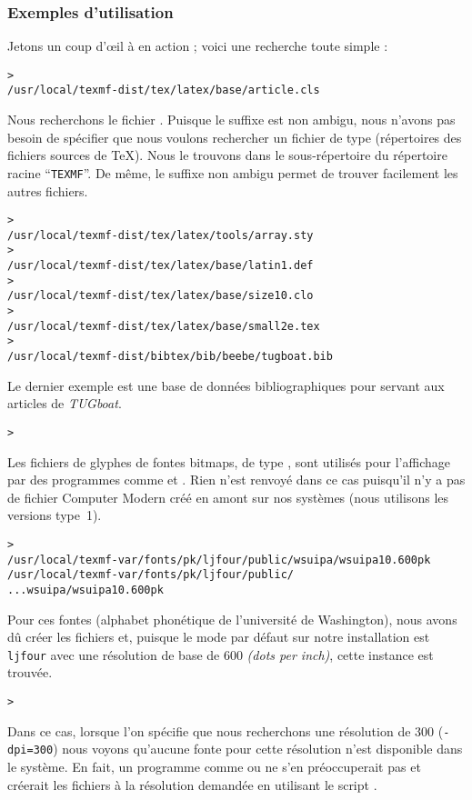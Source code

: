 \documentclass[german, english, french, 12pt]{article}
\renewcommand{\samp}[1]{\enquote{\texttt{#1}}}
\begin{document}
\subsubsection{Exemples d'utilisation}
\label{sec:examples-of-use}

Jetons un coup d'œil à \KPS{} en action ; voici une recherche toute simple :

\begin{alltt}
> 
/usr/local/texmf-dist/tex/latex/base/article.cls
\end{alltt}
Nous recherchons le fichier . Puisque le suffixe 
est non ambigu, nous n'avons pas besoin de spécifier que nous voulons rechercher
un fichier de type  (répertoires des fichiers sources de
\TeX{}). Nous le trouvons dans le sous-répertoire  du
répertoire racine \samp{TEXMF}.  De même, le suffixe non ambigu permet de
trouver facilement les autres fichiers.
\begin{alltt}
> 
   /usr/local/texmf-dist/tex/latex/tools/array.sty
> 
   /usr/local/texmf-dist/tex/latex/base/latin1.def
> 
   /usr/local/texmf-dist/tex/latex/base/size10.clo
> 
   /usr/local/texmf-dist/tex/latex/base/small2e.tex
> 
   /usr/local/texmf-dist/bibtex/bib/beebe/tugboat.bib
\end{alltt}

Le dernier exemple est une base de données bibliographiques pour \BibTeX{}
servant aux articles de \textsl{TUGboat}.

\begin{alltt}
> 
\end{alltt}
Les fichiers de glyphes de fontes bitmaps, de type , sont utilisés
pour l'affichage par des programmes comme  et .
Rien n'est renvoyé dans ce cas puisqu'il n'y a pas de fichier Computer Modern
 créé en amont sur nos systèmes (nous utilisons les versions type~1).
\begin{alltt}
> 
\ifSingleColumn
  /usr/local/texmf-var/fonts/pk/ljfour/public/wsuipa/wsuipa10.600pk
\else /usr/local/texmf-var/fonts/pk/ljfour/public/
...                         wsuipa/wsuipa10.600pk
\fi\end{alltt}
Pour ces fontes (alphabet phonétique de l'université de Washington),
nous avons dû créer les fichiers  et, puisque le mode \MF{} par
défaut sur notre installation est \texttt{ljfour} avec une résolution de
base de 600\dpi{} \textit{(dots per inch)}, cette instance est trouvée.
\begin{alltt}
> 
\end{alltt}
Dans ce cas, lorsque l'on spécifie que nous recherchons une résolution de
300\dpi{} (\texttt{-dpi=300}) nous voyons qu'aucune fonte pour cette résolution
n'est disponible dans le système. En fait, un programme comme  ou
 ne s'en préoccuperait pas et créerait les fichiers 
à la résolution demandée en utilisant le script .
\end{document}
